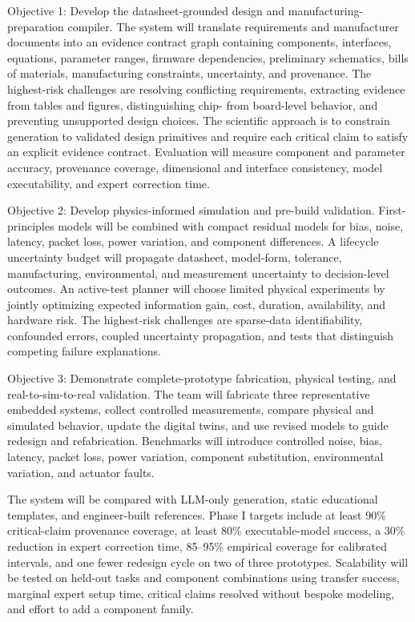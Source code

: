 \documentclass[12pt,letterpaper]{article}
\begin{document}
Objective 1: Develop the datasheet-grounded design and manufacturing-preparation compiler.
The system will translate requirements and manufacturer documents into an evidence contract graph containing components, interfaces, equations, parameter ranges, firmware dependencies, preliminary schematics, bills of materials, manufacturing constraints, uncertainty, and provenance. 
The highest-risk challenges are resolving conflicting requirements, extracting evidence from tables and figures, distinguishing chip- from board-level behavior, and preventing unsupported design choices. 
The scientific approach is to constrain generation to validated design primitives and require each critical claim to satisfy an explicit evidence contract. 
Evaluation will measure component and parameter accuracy, provenance coverage, dimensional and interface consistency, model executability, and expert correction time.

Objective 2: Develop physics-informed simulation and pre-build
validation. 
First-principles models will be combined with compact residual models for bias, noise, latency, packet loss, power variation, and component differences. 
A lifecycle uncertainty budget will propagate datasheet, model-form, tolerance, manufacturing, environmental, and measurement uncertainty to decision-level outcomes. 
An active-test planner will choose limited physical experiments by jointly optimizing expected information gain, cost, duration, availability, and hardware risk. 
The highest-risk challenges are sparse-data identifiability, confounded errors, coupled uncertainty propagation, and tests that distinguish competing failure explanations.

Objective 3: Demonstrate complete-prototype fabrication, physical testing, and real-to-sim-to-real validation.
The team will fabricate three representative embedded systems, collect controlled measurements, compare physical and simulated behavior, update the digital twins, and use revised models to guide redesign and refabrication. 
Benchmarks will introduce controlled noise, bias, latency, packet loss, power variation, component substitution, environmental variation, and actuator faults.

The system will be compared with LLM-only generation, static educational templates, and engineer-built references. 
Phase I targets include at least 90\% critical-claim provenance coverage, at least 80\% executable-model success, a 30\% reduction in expert correction time, 85--95\% empirical coverage for calibrated intervals, and one fewer redesign cycle on two of three prototypes. 
Scalability will be tested on held-out tasks and component combinations using transfer success, marginal expert setup time, critical claims resolved without bespoke modeling, and effort to add a component family.
\end{document}
